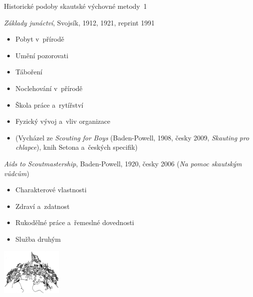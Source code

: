 \documentclass[hyperref={bookmarks=true, unicode=true, colorlinks=true, plainpages=false, pdfkeywords={Skaut, Junak, Skauting, Vychovna metoda}, linkcolor=OrangeRed, anchorcolor=OrangeRed, citecolor=RawSienna, filecolor=RawSienna, menucolor=OrangeRed, urlcolor=RawSienna, pdftex}, compress, xelatex, xcolor=dvipsnames, print]{beamer}
\begin{document}
\begin{frame}{Historické podoby skautské výchovné metody~1}
\begin{multicols}{2}
\textit{Základy junáctví}, Svojsík, 1912, 1921, reprint 1991
\begin{itemize}
 \item Pobyt v~přírodě
 \item Umění pozorovati
 \item Táboření
 \item Noclehování v~přírodě
 \item Škola práce a~rytířství
 \item Fyzický vývoj a~vliv organizace
 \item (Vycházel ze \textit{Scouting for Boys} (Baden-Powell, 1908, česky 2009, \textit{Skauting pro chlapce}), knih Setona a~českých specifik)
\end{itemize}
\columnbreak
\textit{Aids to Scoutmastership}, Baden-Powell, 1920, česky 2006 (\textit{Na pomoc skautským vůdcům})
\begin{itemize}
 \item Charakterové vlastnosti
 \item Zdraví a~zdatnost
 \item Rukodělné práce a~řemeslné dovednosti
 \item Služba druhým
\end{itemize}
\begin{center}
 \includegraphics[width=3cm]{sireni.png}
\end{center}
\end{multicols}
\end{frame}
\end{document}
